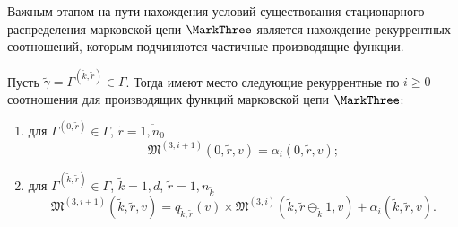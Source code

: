 Важным этапом на пути нахождения условий существования стационарного распределения марковской цепи $\MarkThree$ является нахождение рекуррентных соотношений, которым подчиняются частичные производящие функции. 
\begin{theorem}
Пусть $\tilde{\gamma}=\Gamma^{(\tilde{k}, \tilde{r})} \in \Gamma$. Тогда имеют место следующие рекуррентные по $i \geqslant 0$ соотношения для производящих функций марковской цепи $\MarkThree$:
\begin{enumerate}
\item для $ \Gamma^{(0, \tilde{r})} \in \Gamma$,  $\tilde{r} = \overline{1, n_0}$ 
\begin{equation}
\mathfrak{M}^{(3, i+1)}(0, \tilde{r}, v) = \alpha_i(0, \tilde{r}, v);
\label{three:generation:rek:one}
\end{equation}
\item для $\Gamma^{(\tilde{k}, \tilde{r})} \in \Gamma $,  $\tilde{k} =\overline{1, d}$,  $\tilde{r}=\overline{1, n_{\tilde{k}}}$
\begin{equation}
\mathfrak{M}^{(3, i+1)}(\tilde{k}, \tilde{r}, v) = q_{\tilde{k}, \tilde{r}} (v)\times  \mathfrak{M}^{(3, i)}(\tilde{k}, \tilde{r} \ominus_{\tilde{k}} 1, v) + \alpha_i(\tilde{k}, \tilde{r}, v).
\label{three:generation:rek:two}
\end{equation}
\end{enumerate}

\label{theorem:gen:rek}
\end{theorem}

